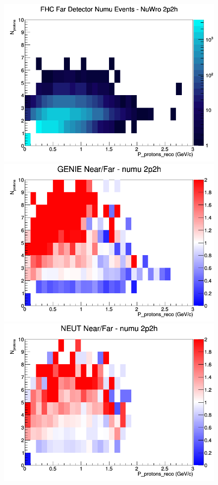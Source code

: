 \begin{figure}[h]
\endminipage
{}
\includegraphics[width=\linewidth]{eff_N_P/GAr/protons/2p2h_FHC_FD_numu_N_P_NuWro.png}
\endminipage
\newline
{}
\includegraphics[width=\linewidth]{eff_N_P/GAr/protons/ratios/2p2h_GENIE_numu_NF_N_P.png}
\endminipage
{}
\includegraphics[width=\linewidth]{eff_N_P/GAr/protons/ratios/2p2h_NEUT_numu_NF_N_P.png}

\end{figure}
